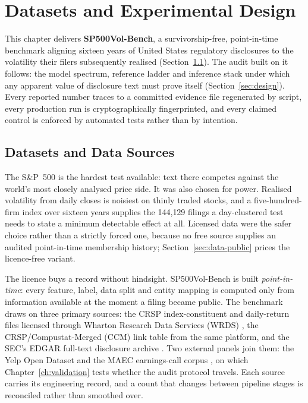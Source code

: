 \chapter{Datasets and Experimental Design}
\label{ch:data}

This chapter delivers \textbf{SP500Vol-Bench}, a survivorship-free, point-in-time benchmark aligning sixteen years of United States regulatory disclosures to the volatility their filers subsequently realised (Section~\ref{sec:data-sources}). The audit built on it follows: the model spectrum, reference ladder and inference stack under which any apparent value of disclosure text must prove itself (Section~\ref{sec:design}). Every reported number traces to a committed evidence file regenerated by script, every production run is cryptographically fingerprinted, and every claimed control is enforced by automated tests rather than by intention.

\section{Datasets and Data Sources}
\label{sec:data-sources}

The S\&P~500 is the hardest test available: text there competes against the world's most closely analysed price side. It was also chosen for power. Realised volatility from daily closes is noisiest on thinly traded stocks, and a five-hundred-firm index over sixteen years supplies the 144{,}129 filings a day-clustered test needs to state a minimum detectable effect at all. %
Licensed data were the safer choice rather than a strictly forced one, because no free source supplies an audited point-in-time membership history; Section~\ref{sec:data-public} prices the licence-free variant.

The licence buys a record without hindsight. SP500Vol-Bench is built \emph{point-in-time}: every feature, label, data split and entity mapping is computed only from information available at the moment a filing became public. The benchmark draws on three primary sources: the CRSP index-constituent and daily-return files licensed through Wharton Research Data Services (WRDS) \cite{crsp2026data}, the CRSP/Compustat-Merged (CCM) link table from the same platform, and the SEC's EDGAR full-text disclosure archive \cite{sec2024edgar}. Two external panels join them: the Yelp Open Dataset \cite{yelp2024dataset} and the MAEC earnings-call corpus \cite{maec2020}, on which Chapter~\ref{ch:validation} tests whether the audit protocol travels. Each source carries its engineering record, and a count that changes between pipeline stages is reconciled rather than smoothed over.

